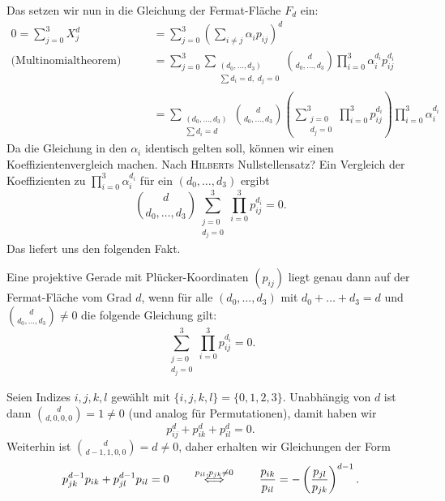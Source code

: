 Das setzen wir nun in die Gleichung der Fermat-Fläche $F_d$ ein:
\begin{align*}
0 = \sum_{j=0}^3 X_j^d &= \sum_{j=0}^3 \left(\sum_{i \neq j} \alpha_i p_{ij} \right)^d \\
\text{(Multinomialtheorem)}\qquad &= \sum_{j=0}^3 \sum_{\substack{(d_0,\dots,d_3) \\ \sum d_i=d,\;d_j=0}} \binom d{d_0,\dots,d_3} \prod_{i=0}^3 \alpha_i^{d_i} p_{ij}^{d_i} \\
	&= \sum_{\substack{(d_0,\dots,d_3) \\ \sum d_i=d}} \binom d{d_0,\dots,d_3} \left(\sum_{\substack{j=0 \\ d_j=0}}^3 \prod_{i=0}^3 p_{ij}^{d_i} \right) \prod_{i=0}^3 \alpha_i^{d_i}
\end{align*}
Da die Gleichung in den $\alpha_i$ identisch gelten soll, können wir einen Koeffizientenvergleich machen. \note Nach \textsc{Hilbert}s Nullstellensatz? Ein Vergleich der Koeffizienten zu $\prod_{i=0}^3 \alpha_i^{d_i}$ für ein $(d_0,\dots,d_3)$ ergibt
\begin{equation}
\binom d{d_0,\dots,d_3} \sum_{\substack{j=0 \\ d_j=0}}^3 \prod_{i=0}^3 p_{ij}^{d_i} = 0.
\end{equation}
Das liefert uns den folgenden Fakt.

\begin{fact}
Eine projektive Gerade mit Plücker-Koordinaten $(p_{ij})$ liegt genau dann auf der Fermat-Fläche vom Grad $d$, wenn für alle $(d_0,\dots,d_3)$ mit $d_0 + \dots + d_3 = d$ und $\binom d{d_0,\dots,d_3} \neq 0$ die folgende Gleichung gilt:
\begin{equation}
\sum_{\substack{j=0 \\ d_j=0}}^3 \prod_{i=0}^3 p_{ij}^{d_i} = 0.
\end{equation}
\end{fact}

\noindent Seien Indizes $i,j,k,l$ gewählt mit $\{i,j,k,l\} = \{0,1,2,3\}$. Unabhängig von $d$ ist dann $\binom d{d,0,0,0} = 1 \neq 0$ (und analog für Permutationen), damit haben wir
\begin{equation} \label{eq:powers}
p_{ij}^d + p_{ik}^d + p_{il}^d = 0.
\end{equation}
Weiterhin ist $\binom d{d-1,1,0,0} = d \neq 0$, daher erhalten wir Gleichungen der Form
\begin{equation} \label{eq:ratios}
p_{jk}^{d-1} p_{ik} + p_{jl}^{d-1} p_{il} = 0 \qquad\overrel\Longleftrightarrow^{p_{il}, p_{jk} \neq 0}\qquad \frac{p_{ik}}{p_{il}} = -\left(\frac{p_{jl}}{p_{jk}}\right)^{d-1}.
\end{equation}

